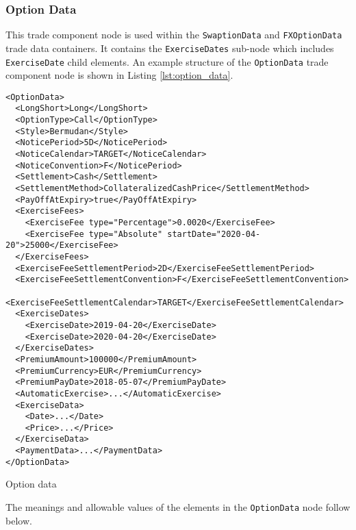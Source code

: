 \subsubsection{Option Data}
\label{ss:option_data} 
This trade component node is used within the \lstinline!SwaptionData! and \lstinline!FXOptionData! trade data
containers. It contains the \lstinline!ExerciseDates! sub-node which includes \lstinline!ExerciseDate! child
elements. An example structure of the \lstinline!OptionData! trade component node is shown in Listing
\ref{lst:option_data}.

\begin{listing}[H]
\begin{verbatim}
<OptionData>
  <LongShort>Long</LongShort>
  <OptionType>Call</OptionType>
  <Style>Bermudan</Style>
  <NoticePeriod>5D</NoticePeriod>
  <NoticeCalendar>TARGET</NoticeCalendar>
  <NoticeConvention>F</NoticePeriod>
  <Settlement>Cash</Settlement>
  <SettlementMethod>CollateralizedCashPrice</SettlementMethod>
  <PayOffAtExpiry>true</PayOffAtExpiry>
  <ExerciseFees>
    <ExerciseFee type="Percentage">0.0020</ExerciseFee>
    <ExerciseFee type="Absolute" startDate="2020-04-20">25000</ExerciseFee>
  </ExerciseFees>
  <ExerciseFeeSettlementPeriod>2D</ExerciseFeeSettlementPeriod>
  <ExerciseFeeSettlementConvention>F</ExerciseFeeSettlementConvention>
  <ExerciseFeeSettlementCalendar>TARGET</ExerciseFeeSettlementCalendar>
  <ExerciseDates>
    <ExerciseDate>2019-04-20</ExerciseDate>
    <ExerciseDate>2020-04-20</ExerciseDate>
  </ExerciseDates>
  <PremiumAmount>100000</PremiumAmount>
  <PremiumCurrency>EUR</PremiumCurrency>
  <PremiumPayDate>2018-05-07</PremiumPayDate>
  <AutomaticExercise>...</AutomaticExercise>
  <ExerciseData>
    <Date>...</Date>
    <Price>...</Price>
  </ExerciseData>
  <PaymentData>...</PaymentData>
</OptionData>
\end{verbatim}
\caption{Option data}
\label{lst:option_data}
\end{listing}

The meanings and allowable values of the elements in the \lstinline!OptionData! node follow below.

